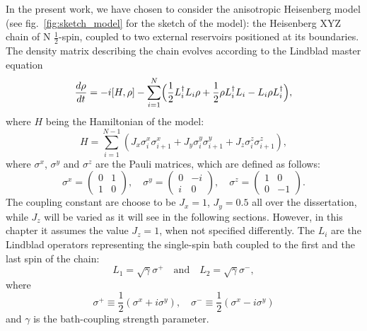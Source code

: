 In the present work, we have chosen to consider the anisotropic Heisenberg model (see fig.~\ref{fig:sketch_model} for the sketch of the model): the Heisenberg XYZ chain of N $\frac{1}{2}$-spin, coupled to two external reservoirs positioned at its boundaries. The density matrix describing the chain evolves according to the Lindblad master equation
\begin{equation}
    \frac{d\rho}{dt} = -i[H, \rho] - \sum_{i=1}^{N}\Bigl(\frac{1}{2}L_i^{\dagger}L_i\rho + \frac{1}{2}\rho L_i^{\dagger}L_i - L_i\rho L_i^{\dagger}\Bigl),
\end{equation}
where
$H$ being the Hamiltonian of the model:
\begin{equation}
\label{ham_chain}
    H = \sum_{i = 1}^{N-1} (J_x \sigma_i^x \sigma_{i+1}^x + J_y \sigma_i^y \sigma_{i+1}^y + J_z \sigma_i^z \sigma_{i+1}^z),
\end{equation}
where $\sigma^x$, $\sigma^y$ and $\sigma^z$ are the Pauli matrices, which are defined as follows:
\begin{equation}
\sigma^x = 
    \begin{pmatrix}
        0 & 1 \\
        1 & 0
    \end{pmatrix}
    , \quad \sigma^y = 
    \begin{pmatrix}
        0 & -i \\
        i & 0
    \end{pmatrix}
    , \quad \sigma^z = 
    \begin{pmatrix}
        1 & 0 \\
        0 & -1
    \end{pmatrix}
    .
\end{equation}
The coupling constant are choose to be $J_x = 1$, $J_y = 0.5$ all over the dissertation, while $J_z$ will be varied as it will see in the following sections. However, in this chapter it assumes the value $J_z = 1$, when not specified differently.
The $L_i$ are the Lindblad operators representing the single-spin bath coupled to the first and the last spin of the chain:
\begin{equation}
\label{dissipators}
    L_1 = \sqrt{\gamma} \sigma^+ \quad \text{and} \quad L_2 =\sqrt{\gamma}\sigma^-,
\end{equation}
where 
\begin{equation*}
    \sigma^+ \equiv \frac{1}{2}(\sigma^x + i\sigma^y), \quad \sigma^- \equiv \frac{1}{2}(\sigma^x - i\sigma^y)
\end{equation*}
and $\gamma$ is the bath-coupling strength parameter.

